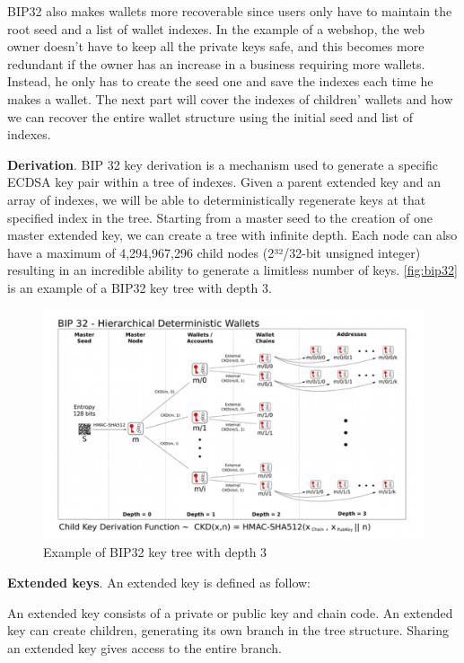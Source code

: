 BIP32 also makes wallets more recoverable since users only have to maintain the root seed and a list of wallet indexes. In the example of a webshop, the web owner doesn’t have to keep all the private keys safe, and this becomes more redundant if the owner has an increase in a business requiring more wallets. Instead, he only has to create the seed one and save the indexes each time he makes a wallet. The next part will cover the indexes of children’ wallets and how we can recover the entire wallet structure using the initial seed and list of indexes.

\bigskip
{\textbf{Derivation}}. BIP 32 key derivation is a mechanism used to generate a specific ECDSA key pair within a tree of indexes. Given a parent extended key and an array of indexes, we will be able to deterministically regenerate keys at that specified index in the tree. Starting from a master seed to the creation of one master extended key, we can create a tree with infinite depth. Each node can also have a maximum of 4,294,967,296 child nodes (2³²/32-bit unsigned integer) resulting in an incredible ability to generate a limitless number of keys. \autoref{fig:bip32} is an example of a BIP32 key tree with depth 3.

\begin{figure}[ht!]
    \centering
    \includegraphics[width=1\textwidth]{images/bip32.png}
    \caption[Example of BIP32 key tree with depth 3]{Example of BIP32 key tree with depth 3 \cite{github/bip0032}}
    \label{fig:bip32}
\end{figure}


\bigskip
{\textbf{Extended keys}}. An extended key is defined as follow:

\begin{adjustwidth}{1.5cm}{}
    An extended key consists of a private or public key and chain code. An extended key can create children, generating its own branch in the tree structure. Sharing an extended key gives access to the entire branch.
\end{adjustwidth}

